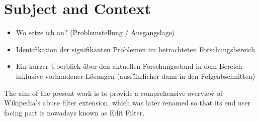 \begin{comment}
As I recently learned, apparently this guideline arose/took such a central position not from the very beginning of the existence of the collaborative encyclopedia.
It rather arose at a time when, after a significant growth in Wikipedia, it wasn't manageable to govern the project (and most importantly fight emergent vandalism which grew proportionally to the project's growth) manually anymore.
To counteract vandalism, a number of automated measures was applied.
These, however, had also unforseen negative consequences: they drove newcomers away~\cite{HalKitRied2011}(quote literature) (since their edits were often classified as "vandalism", because they were not familiar with guidelines / wiki syntax / etc.)
In an attempt to fix this issue, "Assume good faith" rose to a prominent position among Wikipedia's Guidelines.
(Specifically, the page was created on March 3rd, 2004 and was originally refering to good faith during edit wars.
An expansion of the page from December 29th 2004 starts refering to vandalism. https://en.wikipedia.org/w/index.php?title=Wikipedia:Assume_good_faith&oldid=8915036)
\end{comment}
\section{Subject and Context}
\begin{itemize}
	\item Wo setze ich an? (Problemstellung / Ausgangslage)
	\item Identifikation der signifikanten Problemen im betrachteten Forschungsbereich
	\item Ein kurzer Überblick über den aktuellen Forschungsstand in dem Bereich inklusive vorhandener Lösungen (ausführlicher dann in den Folgeabschnitten)
\end{itemize}

The aim of the present work is to provide a comprehensive overview of Wikipedia's abuse filter extension, which was later renamed so that its end user facing part is nowadays known as Edit Filter.


